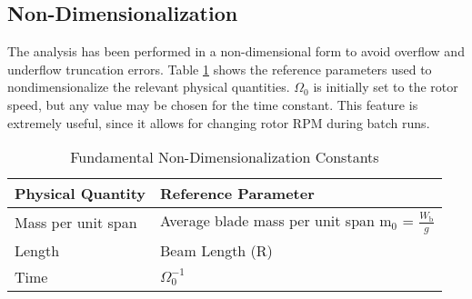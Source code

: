 \subsection*{Non-Dimensionalization}
The analysis has been performed in a non-dimensional form to avoid overflow and underflow truncation errors. Table \ref{tbl:nondiml} shows the reference parameters used to nondimensionalize the relevant physical quantities. $\Omega_0$ is initially set to the rotor speed, but any value may be chosen for the time constant. This feature is extremely useful, since it allows for changing rotor RPM during batch runs.
\begin{table}[ht] 
\begin{minipage}{\columnwidth} 
\centering
\caption{Fundamental Non-Dimensionalization Constants}
\label{tbl:nondiml}
\begin{tabular}{ll} \hline \hline
Physical Quantity & Reference Parameter	  	\\
\hline 
Mass per unit span & Average blade mass per unit span m$_0$ = $\displaystyle \frac{W_\textrm{b}}{g}$\\
Length 			   & Beam Length (R) \\
Time			   & $\Omega_0^{-1}$ \\ 
\hline
\end{tabular} \end{minipage}
\end{table}